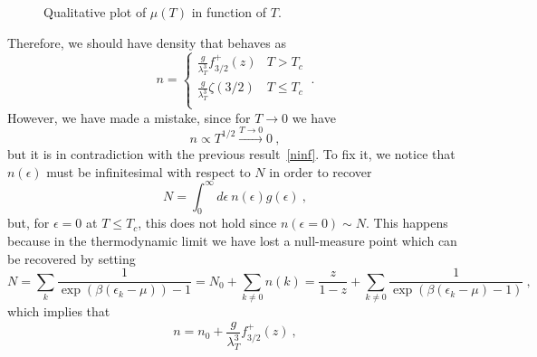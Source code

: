     \begin{figure}[h!]
        \centering
        \caption{Qualitative plot of $\mu(T)$ in function of $T$.}
        \label{fig:mu}
    \end{figure}

    Therefore, we should have density that behaves as 
    \begin{equation*}
        n = \begin{cases}
            \frac{g}{\lambda_T^3} f^+_{3/2} (z) & T > T_c \\
            \frac{g}{\lambda_T^3} \zeta(3/2) & T \leq T_c \\
        \end{cases} ~.
    \end{equation*}
    However, we have made a mistake, since for $T \rightarrow 0$ we have 
    \begin{equation*}
        n \propto T^{1/2} \xrightarrow{T \rightarrow 0} 0 ~,
    \end{equation*}
    but it is in contradiction with the previous result~\eqref{ninf}. To fix it, we notice that $n(\epsilon)$ must be infinitesimal with respect to $N$ in order to recover 
    \begin{equation*}
        N = \int_0^\infty d\epsilon ~ n(\epsilon) g(\epsilon) ~,
    \end{equation*}
    but, for $\epsilon = 0$ at $T \leq T_c$, this does not hold since $n(\epsilon = 0) \sim N$. This happens because in the thermodynamic limit we have lost a null-measure point which can be recovered by setting 
    \begin{equation*}
        N = \sum_k \frac{1}{\exp(\beta(\epsilon_k - \mu)) - 1} = N_0 + \sum_{k\neq 0} n(k) = \frac{z}{1 - z} + \sum_{k\neq 0} \frac{1}{\exp(\beta(\epsilon_k - \mu)-1) } ~,
    \end{equation*}
    which implies that 
    \begin{equation*}
        n = n_0 + \frac{g}{\lambda_T^3} f^+_{3/2} (z) ~,
    \end{equation*}
